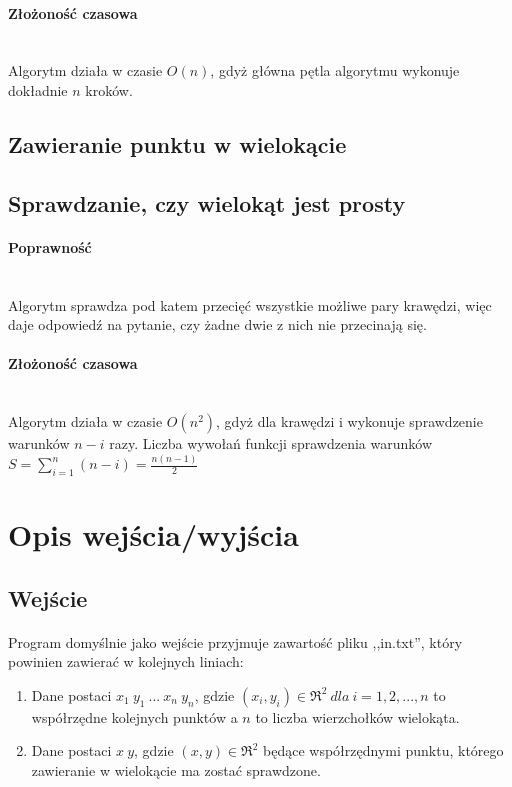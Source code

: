 \documentclass{article}
\begin{document}
\paragraph{Złożoność czasowa} \mbox{}\\
Algorytm działa w czasie \(O(n)\), gdyż główna pętla algorytmu wykonuje dokładnie \(n\) kroków.

\subsection{Zawieranie punktu w wielokącie}


\subsection{Sprawdzanie, czy wielokąt jest prosty}

\paragraph{Poprawność} \mbox{}\\
Algorytm sprawdza pod katem przecięć wszystkie możliwe pary krawędzi, więc daje odpowiedź na pytanie, czy żadne dwie z nich nie przecinają się.

\paragraph{Złożoność czasowa} \mbox{}\\
Algorytm działa w czasie $O(n^2)$, gdyż dla krawędzi i wykonuje sprawdzenie warunków $n-i$ razy. Liczba wywołań funkcji sprawdzenia warunków $S = \sum\limits_{i=1}^n (n-i) = \frac{n(n-1)}{2}$

\section{Opis wejścia/wyjścia}

\subsection{Wejście}

\paragraph{}
Program domyślnie jako wejście przyjmuje zawartość pliku ,,in.txt'', który powinien zawierać w kolejnych liniach:
\begin{enumerate}
\item Dane postaci \(x_1\ y_1\ ...\ x_n\ y_n\), gdzie \((x_i,y_i) \in \Re^{2} \ dla\ i=1,2,...,n\) to współrzędne kolejnych punktów a \(n\) to liczba wierzchołków wielokąta.
\item Dane postaci \(x\ y\), gdzie \((x,y) \in \Re^{2}\) będące współrzędnymi punktu, którego zawieranie w wielokącie ma zostać sprawdzone.
\end{enumerate}
\end{document}
